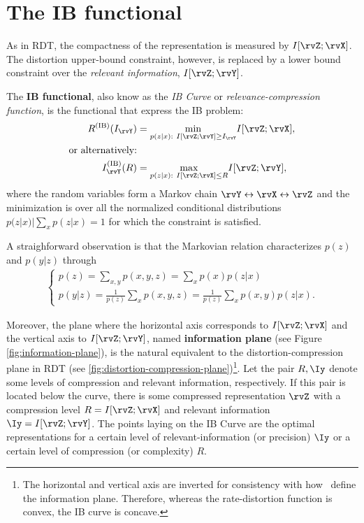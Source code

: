 \section{The IB functional}\label{sec:ib_functional}
As in {RDT}, the compactness of the representation is measured by $I[\rvZ;\rvX]$.  The distortion upper-bound constraint, however, is replaced by a lower bound constraint over the \emph{relevant information}, $I[\rvZ;\rvY]$\cite{slonim:2002}.

\begin{definition} The \textbf{IB functional}, also know as the \emph{IB Curve} or \emph{relevance-compression function}, is the functional that express the IB problem\cite{bachrach:2003}:
\begin{align}
	R^{(\text{IB})}(I_{\rvY}) &= \underset{p(z|x):~ I[\rvZ;\rvY]\geq I_{\rvY}}{\min} I[\rvZ;\rvX],\\
	\text{or alternatively:} \nonumber                                              \\
	I_{\rvY}^{(\text{IB})}(R)&= \underset{p(z|x):~ I[\rvZ;\rvX]\leq R}{\max} I[\rvZ;\rvY],
\end{align}
where the random variables form a Markov chain $\rvY \leftrightarrow  \rvX \leftrightarrow  \rvZ$ and the minimization is over all the normalized conditional distributions $p(z|x)|\sum_x p(z|x)=1$ for which the constraint is satisfied.
\end{definition}
A straighforward observation is that the Markovian relation characterizes $p(z)$ and $p(y|z)$ through\cite{slonim:2002}
\begin{align}
	\begin{cases}
		p(z) = \sum_{x,y} p(x,y,z) = \sum_x p(x)p(z|x)  \\
		p(y|z) = \frac{1}{p(z)}\sum_x p(x,y,z) = \frac{1}{p(z)}\sum_x p(x,y) p(z|x).\label{observation}
	\end{cases}
\end{align}

Moreover, the plane where the horizontal axis corresponds to $I[\rvZ;\rvX]$ and the vertical axis to $I[\rvZ;\rvY]$, named \textbf{information plane} (see Figure \cref{fig:information-plane}), is the natural equivalent to the distortion-compression plane in \acl{RDT} (see \cref{fig:distortion-compression-plane})\footnote{The horizontal and vertical axis are inverted for consistency with how~\cite{tishby:2015} define the information plane. Therefore, whereas the rate-distortion function is convex, the IB curve is concave.}. Let the pair ${R, \Iy}$ denote some levels of compression and relevant information, respectively. If this pair is located below the curve, there is some compressed representation $\rvZ$ with a compression level $R=I[\rvZ;\rvX]$ and relevant information $\Iy=I[\rvZ;\rvY]$. The points laying on the IB Curve are the optimal representations for a certain level of relevant-information (or precision) $\Iy$ or a certain level of compression (or complexity) $R$.


